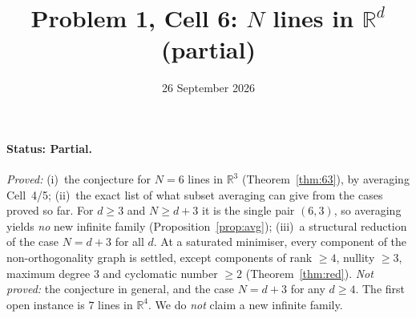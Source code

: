 \documentclass[11pt]{article}
\theoremstyle{remark}
\begin{document}
\title{Problem 1, Cell 6: $N$ lines in $\mathbb R^d$ (partial)}
\date{26 September 2026}
\maketitle

\noindent{}
\medskip

\paragraph{Status: Partial.} \emph{Proved:}
(i)~the conjecture for $N=6$ lines in $\mathbb R^3$ (Theorem~\ref{thm:63}), by averaging Cell~4/5;
(ii)~the exact list of what subset averaging can give from the cases proved so far. For $d\ge3$ and
$N\ge d+3$ it is the single pair $(6,3)$, so averaging yields \emph{no} new infinite family
(Proposition~\ref{prop:avg});
(iii)~a structural reduction of the case $N=d+3$ for all $d$. At a saturated minimiser, every
component of the non-orthogonality graph is settled, except components of rank $\ge4$, nullity
$\ge3$, maximum degree $3$ and cyclomatic number $\ge2$ (Theorem~\ref{thm:red}).
\emph{Not proved:} the conjecture in general, and the case $N=d+3$ for any $d\ge4$. The first open
instance is $7$ lines in $\mathbb R^4$. We do \emph{not} claim a new infinite family.
\end{document}
